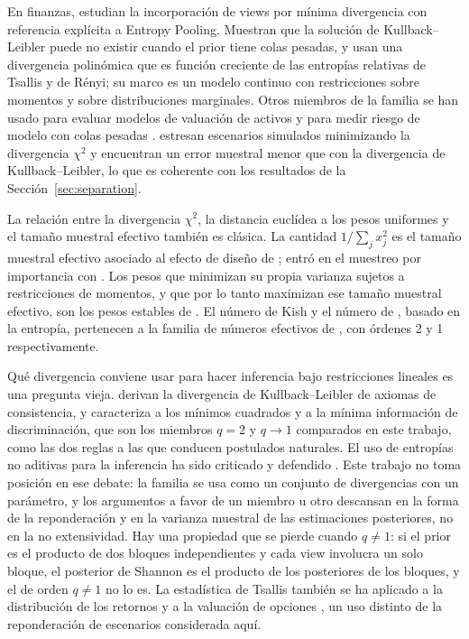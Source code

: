 \documentclass[11pt]{article}
\begin{document}
En finanzas, \citet{DeyJuneja2012} estudian la incorporaci\'on de views por
m\'inima divergencia con referencia expl\'icita a Entropy Pooling. Muestran
que la soluci\'on de Kullback--Leibler puede no existir cuando el prior tiene
colas pesadas, y usan una divergencia polin\'omica que es funci\'on
creciente de las entrop\'ias relativas de Tsallis y de R\'enyi; su marco es un
modelo continuo con restricciones sobre momentos y sobre distribuciones
marginales. Otros miembros de la familia se han usado para evaluar modelos
de valuaci\'on de activos \citep{AlmeidaGarcia2012} y para medir riesgo de
modelo con colas pesadas \citep{GlassermanXu2014}.
\citet{MakamMillossovichTsanakas2021} estresan escenarios simulados
minimizando la divergencia $\chi^2$ y encuentran un error muestral menor
que con la divergencia de Kullback--Leibler, lo que es coherente con los
resultados de la Secci\'on~\ref{sec:separation}.

La relaci\'on entre la divergencia $\chi^2$, la distancia eucl\'idea a los
pesos uniformes y el tama\~no muestral efectivo tambi\'en es cl\'asica. La
cantidad $1/\sum_j x_j^2$ es el tama\~no muestral efectivo asociado al
efecto de dise\~no de \citet{Kish1965}; entr\'o en el muestreo por importancia
con \citet{KongLiuWong1994}. Los pesos que minimizan su propia varianza
sujetos a restricciones de momentos, y que por lo tanto maximizan ese
tama\~no muestral efectivo, son los pesos estables de
\citet{Zubizarreta2015}. El n\'umero de Kish y el n\'umero
de \citet{Meucci2012}, basado en la entrop\'ia, pertenecen a la familia de
n\'umeros efectivos de \citet{Hill1973}, con \'ordenes 2 y 1
respectivamente.

Qu\'e divergencia conviene usar para hacer inferencia bajo restricciones
lineales es una pregunta vieja. \citet{ShoreJohnson1980} derivan la
divergencia de Kullback--Leibler de axiomas de consistencia, y
\citet{Csiszar1991} caracteriza a los m\'inimos cuadrados y a la m\'inima
informaci\'on de discriminaci\'on, que son los miembros $q=2$ y $q \to 1$
comparados en este trabajo, como las dos reglas a las que conducen postulados
naturales. El uso de entrop\'ias no aditivas para la inferencia ha sido
criticado \citep{PresseEtAl2013} y defendido
\citep{Tsallis2015,JizbaKorbel2019}. Este trabajo no toma posici\'on en ese
debate: la familia se usa como un conjunto de divergencias con un
par\'ametro, y los argumentos a favor de un miembro u otro descansan en la
forma de la reponderaci\'on y en la varianza muestral de las estimaciones
posteriores, no en la no extensividad. Hay una propiedad que se pierde
cuando $q \ne 1$: si el prior es el producto de dos bloques independientes y
cada view involucra un solo bloque, el posterior de Shannon es el producto
de los posteriores de los bloques, y el de orden $q \ne 1$ no lo es. La estad\'istica de Tsallis tambi\'en
se ha aplicado a la distribuci\'on de los retornos y a la valuaci\'on de
opciones \citep{Borland2002,TsallisEtAl2003}, un uso distinto de la
reponderaci\'on de escenarios considerada aqu\'i.
\end{document}
